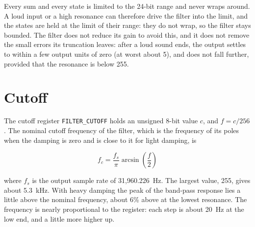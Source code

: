 Every sum and every state is limited to the 24-bit range and never wraps around. A loud input or a high resonance can
therefore drive the filter into the limit, and the states are held at the limit of their range: they do not wrap, so
the filter stays bounded. The filter does not reduce its gain to avoid this, and it does not remove the small errors
its truncation leaves: after a loud sound ends, the output settles to within a few output units of zero (at worst about
5), and does not fall further, provided that the resonance is below 255.

\section{Cutoff}
\label{sec:filter-cutoff}

The cutoff register \texttt{FILTER\_CUTOFF} holds an unsigned 8-bit value $c$, and $f = c / 256$. The nominal cutoff
frequency of the filter, which is the frequency of its poles when the damping is zero and is close to it for light
damping, is

\begin{equation*}
	f_c = \frac{f_s}{\pi} \arcsin\!\left(\frac{f}{2}\right)
\end{equation*}

\noindent where $f_s$ is the output sample rate of 31,960.226~Hz. The largest value, 255, gives about 5.3~kHz. With heavy damping the peak of the band-pass response lies a little above the nominal frequency, about 6\% above at the lowest resonance. The frequency is nearly
proportional to the register: each step is about 20~Hz at the low end, and a little more higher up.

